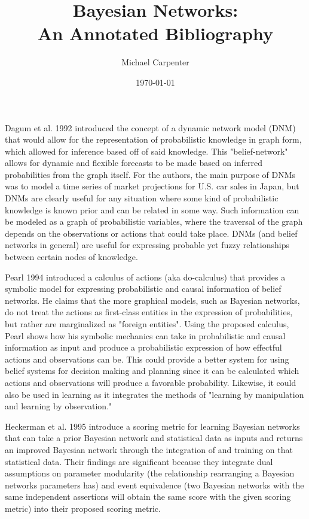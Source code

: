 \documentclass{article}
\title{Bayesian Networks: \\ An Annotated Bibliography}
\author{Michael Carpenter}
\date{\today}
\begin{document}
\maketitle

Dagum et al. 1992\cite{Dagum92} introduced the concept of a dynamic network model (DNM) that would allow for the representation of probabilistic knowledge in graph form, which allowed for inference based off of said knowledge. This "belief-network" allows for dynamic and flexible forecasts to be made based on inferred probabilities from the graph itself. For the authors, the main purpose of DNMs was to model a time series of market projections for U.S. car sales in Japan, but DNMs are clearly
useful for any situation where some kind of probabilistic knowledge is known prior and can be related in some way. Such information can be modeled as a graph of probabilistic variables, where the traversal of the graph depends on the observations or actions that could take place. DNMs (and belief networks in general) are useful for expressing probable yet fuzzy relationships between certain nodes of knowledge.

Pearl 1994\cite{Pearl94} introduced a calculus of actions (aka do-calculus) that provides a symbolic model for expressing probabilistic and causal information of belief networks. He claims that the more graphical models, such as Bayesian networks, do not treat the actions as first-class entities in the expression of probabilities, but rather are marginalized as "foreign entities". Using the proposed calculus, Pearl shows how his symbolic mechanics can take in probabilistic and causal information as input and
produce a probabilistic expression of how effectful actions and observations can be. This could provide a better system for using belief systems for decision making and planning since it can be calculated which actions and observations will produce a favorable probability. Likewise, it could also be used in learning as it integrates the methods of "learning by manipulation and learning by observation."

Heckerman et al. 1995\cite{HeckermanGC95} introduce a scoring metric for learning Bayesian networks that can take a prior Bayesian network and statistical data as inputs and returns an improved Bayesian network through the integration of and training on that statistical data. Their findings are significant because they integrate dual assumptions on parameter modularity (the relationship rearranging a Bayesian networks parameters has) and event equivalence (two Bayesian networks with the same
independent assertions will obtain the same score with the given scoring metric) into their proposed scoring metric.
\end{document}
